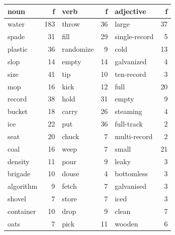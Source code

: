 \documentclass[a4paper,landscape,headrule,footrule,dvips]{foils}
\begin{document}
\begin{CJK}{UTF8}{min}
\begin{small}
  \vspace*{0.5ex}\begin{tabular}{lrlrlr}
    noun       & f    & verb       & f   & adjective     & f   \\   \hline
    water      & 183  & throw      & 36  & large         & 37  \\ 
    spade      & 31   & fill        & 29  & single-record & 5   \\ 
    plastic    & 36   & randomize  & 9   & cold          & 13  \\ 
    slop       & 14   & empty      & 14  & galvanized    & 4   \\ 
    size       & 41   & tip        & 10  & ten-record    & 3   \\ 
    mop        & 16   & kick       & 12  & full          & 20  \\ 
    record     & 38   & hold       & 31  & empty         & 9   \\ 
    bucket     & 18   & carry      & 26  & steaming      & 4   \\ 
    ice        & 22   & put        & 36  & full-track    & 2   \\ 
    seat       & 20   & chuck      & 7   & multi-record  & 2   \\ 
    coal       & 16   & weep       & 7   & small         & 21  \\ 
    density    & 11   & pour       & 9   & leaky         & 3   \\ 
    brigade    & 10   & douse      & 4   & bottomless    & 3   \\ 
    algorithm  & 9    & fetch      & 7   & galvanised    & 3   \\ 
    shovel     & 7    & store      & 7   & iced          & 3   \\ 
    container  & 10   & drop       & 9   & clean         & 7   \\ 
    oats       & 7    & pick       & 11  & wooden        & 6   \\ 
  \end{tabular}
\end{small}\vspace*{-1.0ex}



\end{CJK}
\end{document}
